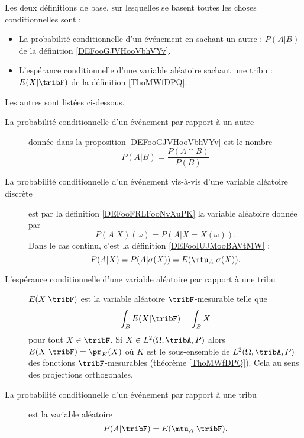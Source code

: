 


    Les deux définitions de base, sur lesquelles se basent toutes les choses conditionnelles sont :
    \begin{itemize}
        \item La probabilité conditionnelle d'un événement en sachant un autre : \( P(A|B)\) de la définition \ref{DEFooGJVHooVbhVYv}.
        \item L'espérance conditionnelle d'une variable aléatoire sachant une tribu : \( E(X|\tribF)\) de la définition \ref{ThoMWfDPQ}.
    \end{itemize}

    Les autres sont listées ci-dessous.
\begin{description}

    \item[La probabilité conditionnelle d'un événement par rapport à un autre] donnée dans la proposition \ref{DEFooGJVHooVbhVYv} est le nombre
\begin{equation}
    P(A|B)=\frac{ P(A\cap B) }{ P(B) }
\end{equation}

\item[La probabilité conditionnelle d'un événement vis-à-vis d'une variable aléatoire discrète] est par la définition \ref{DEFooFRLFooNvXuPK} la variable aléatoire donnée par
\begin{equation}
    P(A|X)(\omega)=P(A|X=X(\omega)).
\end{equation}
Dans le cas continu, c'est la définition \ref{DEFooIUJMooBAVtMW} :
\begin{equation}
    P(A|X)=P(A|\sigma(X))=E(\mtu_A|\sigma(X)).
\end{equation}

\item[L'espérance conditionnelle d'une variable aléatoire par rapport à une tribu] \( E(X|\tribF)\) est la variable aléatoire \( \tribF\)-mesurable telle que
\begin{equation}
    \int_BE(X|\tribF)=\int_BX
\end{equation}
pour tout \( X\in \tribF\). Si \( X\in L^2(\Omega,\tribA,P)\) alors \( E(X|\tribF)=\pr_K(X)\) où \( K\) est le sous-ensemble de \( L^2(\Omega,\tribA,P)\) des fonctions \( \tribF\)-mesurables (théorème \ref{ThoMWfDPQ}). Cela au sens des projections orthogonales.

\item[La probabilité conditionnelle d'un événement par rapport à une tribu] est la variable aléatoire
\begin{equation}
    P(A|\tribF)=E(\mtu_A|\tribF).
\end{equation}


\end{description}
